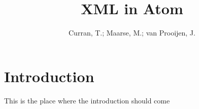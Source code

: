 \documentclass{report}
\title{XML in Atom}
\author{Curran, T.; Maarse, M.; van Prooijen, J.}
\begin{document}
	\maketitle{}
	\tableofcontents
	\section{Introduction}
	This is the place where the introduction should come 
	
	
	
	
\end{document}
